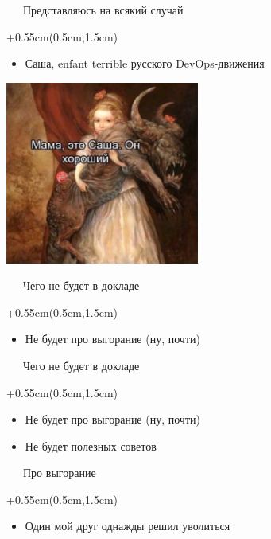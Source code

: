 \documentclass[xetex,18pt,aspectratio=169]{beamer}
\begin{document}
\begin{Large}

\begin{frame}{\ \ \ Представляюсь на всякий случай}
\begin{textblock*}{\framewidth+0.55cm}(0.5cm,1.5cm)
\begin{itemize}
  \item Саша, enfant terrible русского DevOps-движения
\end{itemize}
\begin{minipage}{\textwidth}
  \centering
  \includegraphics[height=6.0cm]{img/sasha}
\end{minipage}
\end{textblock*}
\end{frame}
  
\begin{frame}{\ \ \ Чего не будет в докладе}
\begin{textblock*}{\framewidth+0.55cm}(0.5cm,1.5cm)
\begin{itemize}
  \item Не будет про выгорание (ну, почти)
\end{itemize}
\end{textblock*}
\end{frame}

\begin{frame}{\ \ \ Чего не будет в докладе}
\begin{textblock*}{\framewidth+0.55cm}(0.5cm,1.5cm)
\begin{itemize}
  \item Не будет про выгорание (ну, почти)
  \item Не будет полезных советов
\end{itemize}
\end{textblock*}
\end{frame}

\begin{frame}{\ \ \ Про выгорание}
\begin{textblock*}{\framewidth+0.55cm}(0.5cm,1.5cm)
\begin{itemize}
  \item Один мой друг однажды решил уволиться
\end{itemize}
\end{textblock*}
\end{frame}


\end{Large}
\end{document}
